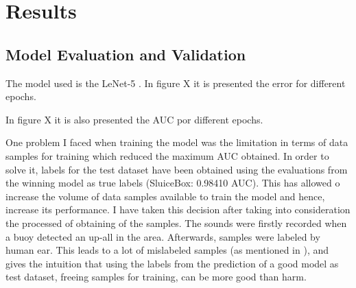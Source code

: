 \documentclass[]{article}
\begin{document}
\section{Results}\label{iv.-results}


\subsection{Model Evaluation and Validation}\label{model-evaluation-and-validation}

The model used is the LeNet-5 \cite{Lecun98}. In figure X it is presented the error for different epochs.


In figure X it is also presented the AUC por different epochs.

One problem I faced when training the model was the limitation in terms of data samples for training which reduced the maximum AUC obtained. In order to solve it, labels for the test dataset have been obtained using the evaluations from the winning model as true labels (SluiceBox: 0.98410 AUC). This has allowed o increase the volume of data samples available to train the model and hence, increase its performance. I have taken this decision after taking into consideration the processed of obtaining of the samples. The sounds were firstly recorded when a buoy detected an up-all in the area. Afterwards, samples were labeled by human ear. This leads to a lot of mislabeled samples (as mentioned in \cite{Nouriblog}), and gives the intuition that using the labels from the prediction of a good model as test dataset, freeing samples for training, can be more good than harm.
\end{document}
